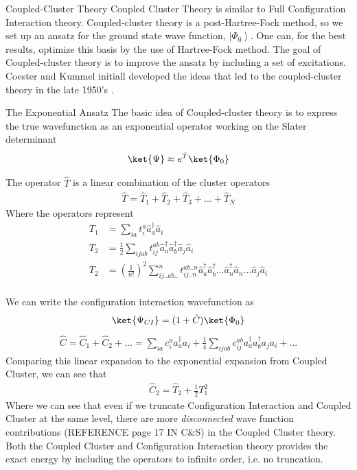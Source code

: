 \documentclass[twoside,english]{uiofysmaster}
\begin{document}
\begin{chapter}{Coupled-Cluster Theory} 
	Coupled Cluster Theory is similar to Full Configuration Interaction theory. Coupled-cluster theory is a post-Hartree-Fock method, so we set up an ansatz for the ground state wave function, $\left| \Phi_0 \right>$. One can, for the best results, optimize this basis by the use of Hartree-Fock method. The goal of Coupled-cluster theory is to improve the ansatz by including a set of excitations. Coester and Kummel initiall developed the ideas that led to the coupled-cluster theory in the late 1950's \cite{MHJonline}. 
 	
 	\begin{section}{The Exponential Ansatz}
 		The basic idea of Coupled-cluster theory is to express the true wavefunction as an exponential operator working on the Slater determinant  
 		\begin{align}
	 		\ket{\Psi} \approx e^{\hat T} \ket{\Phi_0}
	  	\end{align}


 	\end{section}

 	
  	The operator $\hat T$ is a linear combination of the cluster operators
  	\begin{align}
  		\hat T = \hat T_1 + \hat T_2 + \hat T_3 + ... + \hat T_N
  	\end{align}
  	Where the operators represent
  	\begin{align}
  		T_1 &= \sum_{ia} t_i^a \hat a_a^{\dagger} \hat a_i \\
  		T_2 &= \frac{1}{2} \sum_{ijab} t_{ij}^{ab} \hat a_a^{\dagger}\hat a_b^{\dagger} \hat a_j \hat a_i \\
  		T_2 &= \left(\frac{1}{n!}\right)^2 \sum_{ij..ab..}^n t_{ij..n}^{ab..n} \hat a_a^{\dagger}\hat a_b^{\dagger} ...\hat a_n^{\dagger} \hat a_n ... \hat a_j \hat a_i \\
  	\end{align}

  	We can write the configuration interaction wavefunction as 
  	\begin{align}
  		\ket{\Psi_{CI}} = (1 + \hat C) \ket{\Phi_0} 
   	\end{align}
  	\begin{align}
  		\hat C = \hat C_1 + \hat C_2 + ... =  \sum_{ia} c_i^a a_a^{\dagger} a_i + \frac{1}{4} \sum_{ijab} c_{ij}^{ab} a_a^{\dagger} a_b^{\dagger} a_j a_i + ...
   	\end{align}
   	Comparing this linear expansion to the exponential expansion from Coupled Cluster, we can see that
   	\begin{align}
   		\hat C_2 = \hat T_2 + \frac{1}{2} T_1^2
   	\end{align}
   	Where we can see that even if we truncate Configuration Interaction and Coupled Cluster at the same level, there are more \textit{disconnected} wave function contributions (REFERENCE page 17 IN C\&S) in the Coupled Cluster theory. Both the Coupled Cluster and Configuration Interaction theory provides the exact energy by including the operators to infinite order, i.e. no truncation. 


\end{chapter}
\end{document}
